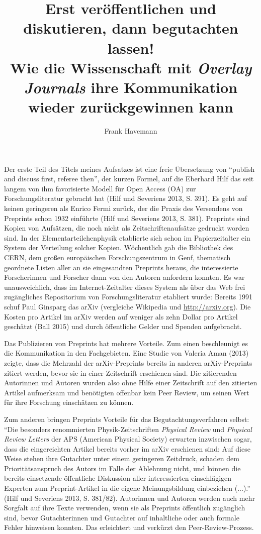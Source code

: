 \documentclass[a4paper,
fontsize=11pt,
oneside,
numbers=noperiodatend,
parskip=half-,
bibliography=totoc,
final
]{scrartcl}
\title{\LARGE{Erst veröffentlichen und diskutieren, dann begutachten lassen!\\ Wie die Wissenschaft mit \emph{Overlay Journals} ihre Kommunikation wieder zurückgewinnen kann
}} %
\author{Frank Havemann} %
\date{}
\begin{document}
\maketitle
\thispagestyle{fancyplain} 


Der erste Teil des Titels meines Aufsatzes ist eine freie Übersetzung
von \enquote{publish and discuss first, referee then}, der kurzen
Formel, auf die Eberhard Hilf das seit langem von ihm favorisierte
Modell für Open Access (OA) zur Forschungsliteratur gebracht hat (Hilf
und Severiens 2013, S. 391). Es geht auf keinen geringeren als Enrico
Fermi zurück, der die Praxis des Versendens von Preprints schon 1932
einführte (Hilf und Severiens 2013, S. 381). Preprints sind Kopien von
Aufsätzen, die noch nicht als Zeitschriftenaufsätze gedruckt worden
sind. In der Elementarteilchenphysik etablierte sich schon im
Papierzeitalter ein System der Verteilung solcher Kopien. Wöchentlich
gab die Bibliothek des CERN, dem großen europäischen Forschungszentrum
in Genf, thematisch geordnete Listen aller an sie eingesandten Preprints
heraus, die interessierte Forscherinnen und Forscher dann von den
Autoren anfordern konnten. Es war unausweichlich, dass im
Internet-Zeitalter dieses System als über das Web frei zugängliches
Repositorium von Forschungsliteratur etabliert wurde: Bereits 1991 schuf
Paul Ginsparg das arXiv (vergleiche Wikipedia und
\url{http://arxiv.org}). Die Kosten pro Artikel im arXiv werden auf
weniger als zehn Dollar pro Artikel geschätzt (Ball 2015) und durch
öffentliche Gelder und Spenden aufgebracht.

Das Publizieren von Preprints hat mehrere Vorteile. Zum einen
beschleunigt es die Kommunikation in den Fachgebieten. Eine Studie von
Valeria Aman (2013) zeigte, dass die Mehrzahl der arXiv-Preprints
bereits in anderen arXiv-Preprints zitiert werden, bevor sie in einer
Zeitschrift erschienen sind. Die zitierenden Autorinnen und Autoren
wurden also ohne Hilfe einer Zeitschrift auf den zitierten Artikel
aufmerksam und benötigten offenbar kein Peer Review, um seinen Wert für
ihre Forschung einschätzen zu können.

Zum anderen bringen Preprints Vorteile für das Begutachtungsverfahren
selbst: \enquote{Die besonders renommierten Physik-Zeitschriften
\emph{Physical Review} und \emph{Physical Review Letters} der APS
(American Physical Society) erwarten inzwischen sogar, dass die
eingereichten Artikel bereits vorher im arXiv erschienen sind: Auf diese
Weise stehen ihre Gutachter unter einem geringeren Zeitdruck, schaden
dem Prioritätsanspruch des Autors im Falle der Ablehnung nicht, und
können die bereits einsetzende öffentliche Diskussion aller
interessierten einschlägigen Experten zum Preprint-Artikel in die eigene
Meinungsbildung einbeziehen (...).} (Hilf und Severiens 2013, S.
381/82). Autorinnen und Autoren werden auch mehr Sorgfalt auf ihre Texte
verwenden, wenn sie als Preprints öffentlich zugänglich sind, bevor
Gutachterinnen und Gutachter auf inhaltliche oder auch formale Fehler
hinweisen konnten. Das erleichtert und verkürzt den Peer-Review-Prozess.
\end{document}
